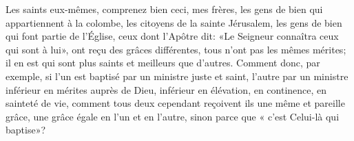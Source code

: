 Les saints eux-mêmes, comprenez bien ceci, mes frères,
	les gens de bien qui appartiennent à la colombe,
	les citoyens de la sainte Jérusalem,
	les gens de bien qui font partie de l’Église,
	ceux dont l’Apôtre dit: «Le Seigneur connaîtra ceux qui sont à lui»,
	ont reçu des grâces différentes, tous n’ont pas les mêmes mérites;
	il en est qui sont plus saints et meilleurs que d’autres.
Comment donc, par exemple, si l’un est baptisé par un ministre juste et saint,
	l’autre par un ministre inférieur en mérites auprès de Dieu,
	inférieur en élévation, en continence, en sainteté de vie,
	comment tous deux cependant reçoivent ils une même et pareille grâce,
	une grâce égale en l’un et en l’autre,
	sinon parce que « c’est Celui-là qui baptise»? 

